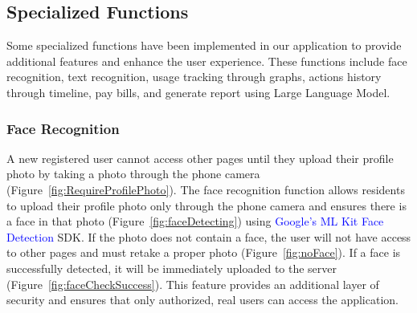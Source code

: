 \documentclass[sigconf]{acmart}
\newcommand{\specialterm}[1]{\textcolor{blue}{#1}}
\begin{document}
\subsection{Specialized Functions}
Some specialized functions have been implemented in our application to provide additional features and enhance the user experience. These functions include face recognition, text recognition, usage tracking through graphs, actions history through timeline, pay bills, and generate report using Large Language Model.

\subsubsection{Face Recognition}
A new registered user cannot access other pages until they upload their profile photo by taking a photo through the phone camera (Figure~\ref{fig:RequireProfilePhoto}).
The face recognition function allows residents to upload their profile photo only through the phone camera and ensures there is a face in that photo (Figure~\ref{fig:faceDetecting}) using \specialterm{Google's ML Kit Face Detection} SDK. If the photo does not contain a face, the user will not have access to other pages and must retake a proper photo (Figure~\ref{fig:noFace}). If a face is successfully detected, it will be immediately uploaded to the server (Figure~\ref{fig:faceCheckSuccess}).
This feature provides an additional layer of security and ensures that only authorized, real users can access the application.
\end{document}
